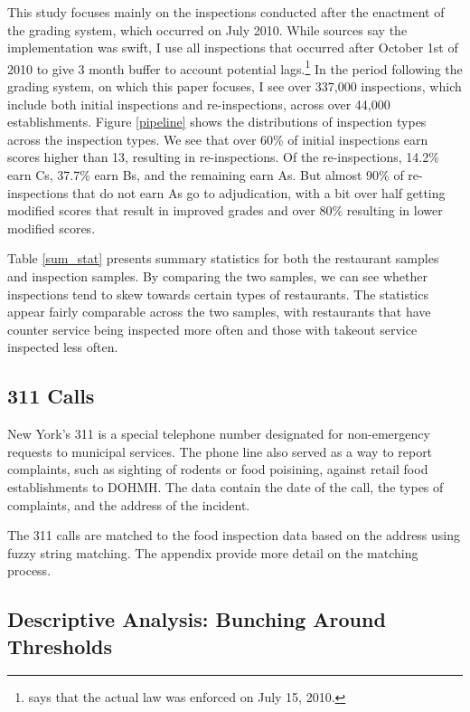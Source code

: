 \documentclass[11pt]{article}
\begin{document}
This study focuses mainly on the inspections conducted after the enactment of the grading system, which occurred on July 2010. While sources say the implementation was swift, I use all inspections that occurred after October 1st of 2010 to give 3 month buffer to account potential lags.\footnote{\cite{Ho_2012} says that the actual law was enforced on July 15, 2010.} In the period following the grading system, on which this paper focuses, I see over 337,000 inspections, which include both initial inspections and re-inspections, across over 44,000 establishments. Figure \ref{pipeline} shows the distributions of inspection types across the inspection types. We see that over 60\% of initial inspections earn scores higher than 13, resulting in re-inspections. Of the re-inspections, 14.2\% earn Cs, 37.7\% earn Bs, and the remaining earn As. But almost 90\% of re-inspections that do not earn As go to adjudication, with a bit over half getting modified scores that result in improved grades and over 80\% resulting in lower modified scores. 

Table \ref{sum_stat} presents summary statistics for both the restaurant samples and inspection samples. By comparing the two samples, we can see whether inspections tend to skew towards certain types of restaurants. The statistics appear fairly comparable across the two samples, with restaurants that have counter service being inspected more often and those with takeout service inspected less often. 
\subsection{311 Calls}

New York's 311 is a special telephone number designated for non-emergency requests to municipal services. The phone line also served as a way to report complaints, such as sighting of rodents or food poisining, against retail food establishments to DOHMH. The data contain the date of the call, the types of complaints, and the address of the incident. 

The 311 calls are matched to the food inspection data based on the address using fuzzy string matching. The appendix provide more detail on the matching process. 

\subsection{Descriptive Analysis: Bunching Around Thresholds}
\end{document}
